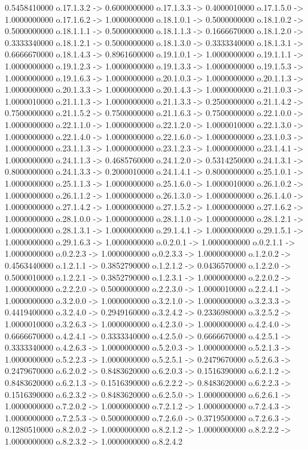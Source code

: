 0.5458410000    o.17.1.3.2 -> 0.6000000000    o.17.1.3.3 -> 0.4000010000    o.17.1.5.0 -> 1.0000000000    o.17.1.6.2 -> 1.0000000000    o.18.1.0.1 -> 0.5000000000    o.18.1.0.2 -> 0.5000000000    o.18.1.1.1 -> 0.5000000000    o.18.1.1.3 -> 0.1666670000    o.18.1.2.0 -> 0.3333340000    o.18.1.2.1 -> 0.5000000000    o.18.1.3.0 -> 0.3333340000    o.18.1.3.1 -> 0.6666670000    o.18.1.4.3 -> 0.8961600000    o.19.1.0.1 -> 1.0000000000    o.19.1.1.1 -> 1.0000000000    o.19.1.2.3 -> 1.0000000000    o.19.1.3.3 -> 1.0000000000    o.19.1.5.3 -> 1.0000000000    o.19.1.6.3 -> 1.0000000000    o.20.1.0.3 -> 1.0000000000    o.20.1.1.3 -> 1.0000000000    o.20.1.3.3 -> 1.0000000000    o.20.1.4.3 -> 1.0000000000    o.21.1.0.3 -> 1.0000010000    o.21.1.1.3 -> 1.0000000000    o.21.1.3.3 -> 0.2500000000    o.21.1.4.2 -> 0.7500000000    o.21.1.5.2 -> 0.7500000000    o.21.1.6.3 -> 0.7500000000    o.22.1.0.0 -> 1.0000000000    o.22.1.1.0 -> 1.0000000000    o.22.1.2.0 -> 1.0000010000    o.22.1.3.0 -> 1.0000000000    o.22.1.4.0 -> 1.0000000000    o.22.1.6.0 -> 1.0000000000    o.23.1.0.3 -> 1.0000000000    o.23.1.1.3 -> 1.0000000000    o.23.1.2.3 -> 1.0000000000    o.23.1.4.1 -> 1.0000000000    o.24.1.1.3 -> 0.4685760000    o.24.1.2.0 -> 0.5314250000    o.24.1.3.1 -> 0.8000000000    o.24.1.3.3 -> 0.2000010000    o.24.1.4.1 -> 0.8000000000    o.25.1.0.1 -> 1.0000000000    o.25.1.1.3 -> 1.0000000000    o.25.1.6.0 -> 1.0000010000    o.26.1.0.2 -> 1.0000000000    o.26.1.1.2 -> 1.0000000000    o.26.1.3.0 -> 1.0000000000    o.26.1.4.0 -> 1.0000000000    o.27.1.4.2 -> 1.0000000000    o.27.1.5.2 -> 1.0000000000    o.27.1.6.2 -> 1.0000000000    o.28.1.0.0 -> 1.0000000000    o.28.1.1.0 -> 1.0000000000    o.28.1.2.1 -> 1.0000000000    o.28.1.3.1 -> 1.0000000000    o.29.1.4.1 -> 1.0000000000    o.29.1.5.1 -> 1.0000000000    o.29.1.6.3 -> 1.0000000000    o.0.2.0.1 -> 1.0000000000    o.0.2.1.1 -> 1.0000000000    o.0.2.2.3 -> 1.0000000000    o.0.2.3.3 -> 1.0000000000    o.1.2.0.2 -> 0.4563440000    o.1.2.1.1 -> 0.3852790000    o.1.2.1.2 -> 0.0436570000    o.1.2.2.0 -> 0.5000010000    o.1.2.2.1 -> 0.3852790000    o.1.2.3.1 -> 1.0000000000    o.2.2.0.2 -> 1.0000000000    o.2.2.2.0 -> 0.5000000000    o.2.2.3.0 -> 1.0000010000    o.2.2.4.1 -> 1.0000000000    o.3.2.0.0 -> 1.0000000000    o.3.2.1.0 -> 1.0000000000    o.3.2.3.3 -> 0.4419400000    o.3.2.4.0 -> 0.2949160000    o.3.2.4.2 -> 0.2336980000    o.3.2.5.2 -> 1.0000010000    o.3.2.6.3 -> 1.0000000000    o.4.2.3.0 -> 1.0000000000    o.4.2.4.0 -> 0.6666670000    o.4.2.4.1 -> 0.3333340000    o.4.2.5.0 -> 0.6666670000    o.4.2.5.1 -> 0.3333340000    o.4.2.6.3 -> 1.0000000000    o.5.2.0.3 -> 1.0000000000    o.5.2.1.3 -> 1.0000000000    o.5.2.2.3 -> 1.0000000000    o.5.2.5.1 -> 0.2479670000    o.5.2.6.3 -> 0.2479670000    o.6.2.0.2 -> 0.8483620000    o.6.2.0.3 -> 0.1516390000    o.6.2.1.2 -> 0.8483620000    o.6.2.1.3 -> 0.1516390000    o.6.2.2.2 -> 0.8483620000    o.6.2.2.3 -> 0.1516390000    o.6.2.3.2 -> 0.8483620000    o.6.2.5.0 -> 1.0000000000    o.6.2.6.1 -> 1.0000000000    o.7.2.0.2 -> 1.0000000000    o.7.2.1.2 -> 1.0000000000    o.7.2.4.3 -> 1.0000000000    o.7.2.5.3 -> 0.5000000000    o.7.2.6.0 -> 0.3719500000    o.7.2.6.3 -> 0.1280510000    o.8.2.0.2 -> 1.0000000000    o.8.2.1.2 -> 1.0000000000    o.8.2.2.2 -> 1.0000000000    o.8.2.3.2 -> 1.0000000000    o.8.2.4.2 